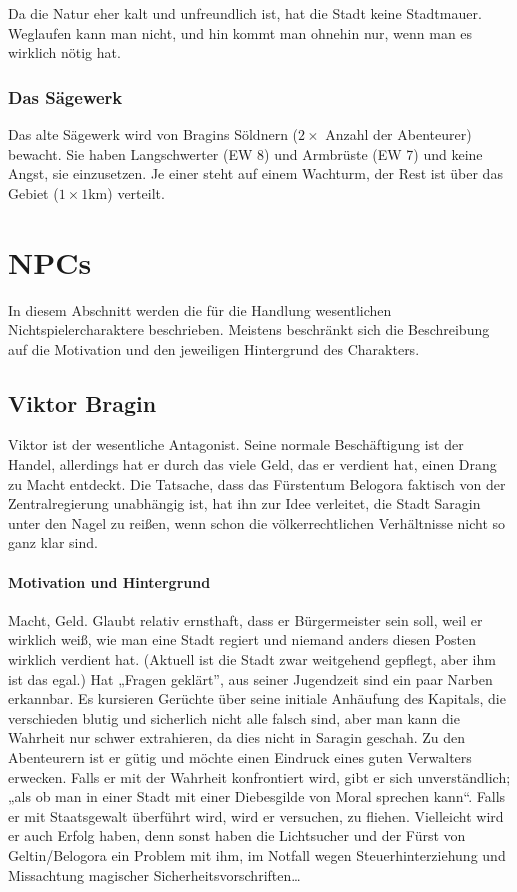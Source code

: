 \documentclass[a4paper,10pt]{scrartcl}
\begin{document}
Da die Natur eher kalt und unfreundlich ist, hat die Stadt keine
Stadtmauer. Weglaufen kann man nicht, und hin kommt man ohnehin nur,
wenn man es wirklich nötig hat.

\subsubsection{Das Sägewerk}

Das alte Sägewerk wird von Bragins Söldnern ($2 \times$ Anzahl der
Abenteurer) bewacht. Sie haben Langschwerter (EW 8) und Armbrüste (EW 7)
und keine Angst, sie einzusetzen. Je einer steht auf einem Wachturm, der
Rest ist über das Gebiet ($1 \times 1$\si{km}) verteilt.

\bestiarium[name=Bragins Södner, mag=false, typ=Mensch, grad=3,
In=m65, LP=26, AP=38, St=80, Gw=76]{}

\section{NPCs}

In diesem Abschnitt werden die für die Handlung wesentlichen
Nichtspielercharaktere beschrieben. Meistens beschränkt sich die
Beschreibung auf die Motivation und den jeweiligen Hintergrund des
Charakters.

\subsection{Viktor Bragin}

Viktor ist der wesentliche Antagonist. Seine normale Beschäftigung ist
der Handel, allerdings hat er durch das viele Geld, das er verdient hat,
einen Drang zu Macht entdeckt. Die Tatsache, dass das Fürstentum
Belogora faktisch von der Zentralregierung unabhängig ist, hat ihn zur
Idee verleitet, die Stadt Saragin unter den Nagel zu reißen, wenn schon
die völkerrechtlichen Verhältnisse nicht so ganz klar sind.

\paragraph{Motivation und Hintergrund} Macht, Geld. Glaubt relativ
ernsthaft, dass er Bürgermeister sein soll, weil er wirklich weiß, wie man
eine Stadt regiert und niemand anders diesen Posten wirklich verdient
hat. (Aktuell ist die Stadt zwar weitgehend gepflegt, aber ihm ist das
egal.) Hat „Fragen geklärt”, aus seiner Jugendzeit sind ein paar Narben
erkannbar. Es kursieren Gerüchte über seine initiale Anhäufung des
Kapitals, die verschieden blutig und sicherlich nicht alle falsch sind,
aber man kann die Wahrheit nur schwer extrahieren, da dies nicht in
Saragin geschah. Zu den Abenteurern ist er gütig und möchte einen
Eindruck eines guten Verwalters erwecken. Falls er mit der Wahrheit
konfrontiert wird, gibt er sich unverständlich; „als ob man in einer
Stadt mit einer Diebesgilde von Moral sprechen kann“. Falls er mit
Staatsgewalt überführt wird, wird er versuchen, zu fliehen. Vielleicht
wird er auch Erfolg haben, denn sonst haben die Lichtsucher und der
Fürst von Geltin/Belogora ein Problem mit ihm, im Notfall wegen
Steuerhinterziehung und Missachtung magischer Sicherheitsvorschriften…
\end{document}
